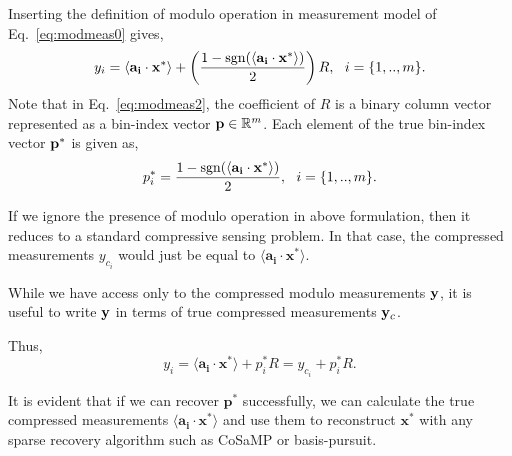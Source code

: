 Inserting the definition of modulo operation in measurement model of Eq.~\ref{eq:modmeas0} gives,
\begin{equation}
y_i= \langle \mathbf{a_i} \cdot \mathbf{x^*} \rangle+\left( \frac{1-\mathrm{sgn}(\langle \mathbf{a_i} \cdot \mathbf{x^*} \rangle)}{2}\right)R,~~i = \{1,..,m\}.
\label{eq:modmeas2}
\end{equation} 
Note that in Eq.~\ref{eq:modmeas2}, the coefficient of $R$ is a binary column vector represented as a bin-index vector $\mathbf{p} \in {\mathbb{R}}^m$. Each element of the true bin-index vector $\mathbf{p}^*$ is given as,
$$
p^*_i = \frac{1-\mathrm{sgn}(\langle \mathbf{a_i} \cdot \mathbf{x^*} \rangle)}{2},~~i = \{1,..,m\}.
$$


If we ignore the presence of modulo operation in above formulation, then it reduces to a standard compressive sensing problem. In that case, the compressed measurements $y_{c_i}$ would just be equal to $\langle \mathbf{a_i} \cdot \mathbf{x^*} \rangle$.    %

While we have access only to the compressed modulo measurements $\mathbf{y}$, it is useful to write $\mathbf{y}$ in terms of true compressed measurements $\mathbf{y}_c$. 

Thus,
$$
y_i = \langle \mathbf{a_i} \cdot \mathbf{x^*} \rangle + p^*_iR = y_{c_i}+p^*_iR.
$$

It is evident that if we can recover $\mathbf{p^*}$ successfully, we can calculate the true compressed measurements $\langle \mathbf{a_i} \cdot \mathbf{x^*} \rangle$ and use them to reconstruct $\mathbf{x^*}$ with any sparse recovery algorithm such as CoSaMP or basis-pursuit.
